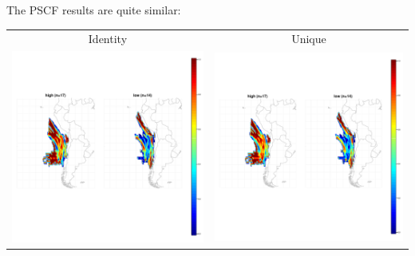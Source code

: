 \documentclass{article}
\begin{document}
The PSCF results are quite similar:
\begin{center}
\begin{tabular}{cc}
Identity & Unique \\
\includegraphics[width=.5\textwidth]{identitypg2.pdf} & \includegraphics[width=.5\textwidth]{uniquepg2.pdf}
\end{tabular}
\end{center}
\end{document}
